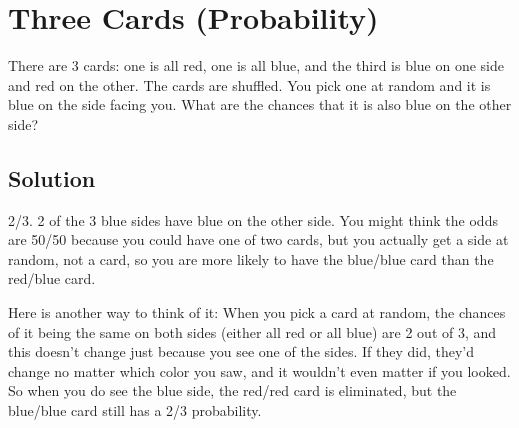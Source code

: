 \section{Three Cards (Probability)}
There are 3 cards: one is all red, one is all blue, and the third is blue on one side and red on the other. The cards are shuffled. You pick one at random and it is blue on the side facing you. What are the chances that it is also blue on the other side?

\subsection{Solution}
2/3. 2 of the 3 blue sides have blue on the other side. You might think the odds are 50/50 because you could have one of two cards, but you actually get a side at random, not a card, so you are more likely to have the blue/blue card than the red/blue card.

Here is another way to think of it: When you pick a card at random, the chances of it being the same on both sides (either all red or all blue) are 2 out of 3, and this doesn't change just because you see one of the sides. If they did, they'd change no matter which color you saw, and it wouldn't even matter if you looked. So when you do see the blue side, the red/red card is eliminated, but the blue/blue card still has a 2/3 probability.
